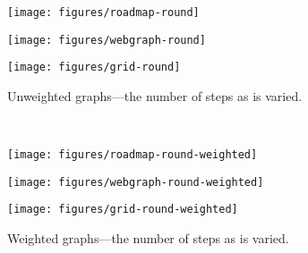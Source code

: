 \begin{figure*}[t]
\begin{center}
    \begin{minipage}[t]{0.45\textwidth}
\begin{center}
    \begin{minipage}[t]{\textwidth}
        \texttt{[image: figures/roadmap-round]}\\ 
    \end{minipage}
    \begin{minipage}[t]{\textwidth}
        \texttt{[image: figures/webgraph-round]}\\ 
    \end{minipage}
    \begin{minipage}[t]{\textwidth}
        \texttt{[image: figures/grid-round]}\\ 
    \end{minipage}
  \caption{Unweighted graphs---the number of \AlgName{} steps as  is varied.}\label{fig:numerofrounds}
\end{center}
    \end{minipage}  ~~~~~
    \begin{minipage}[t]{0.45\textwidth}
\begin{center}
    \begin{minipage}[t]{\textwidth}
        \texttt{[image: figures/roadmap-round-weighted]}\\ 
    \end{minipage}
    \begin{minipage}[t]{\textwidth}
        \texttt{[image: figures/webgraph-round-weighted]}\\ 
    \end{minipage}
    \begin{minipage}[t]{\textwidth}
        \texttt{[image: figures/grid-round-weighted]}\\ 
    \end{minipage}
    \caption{Weighted graphs---the number of \AlgName{} steps as  is
      varied.}\label{fig:numerofroundsw}
\end{center}
    \end{minipage}
\end{center}
  \vspace{-2.5em}
\end{figure*}



